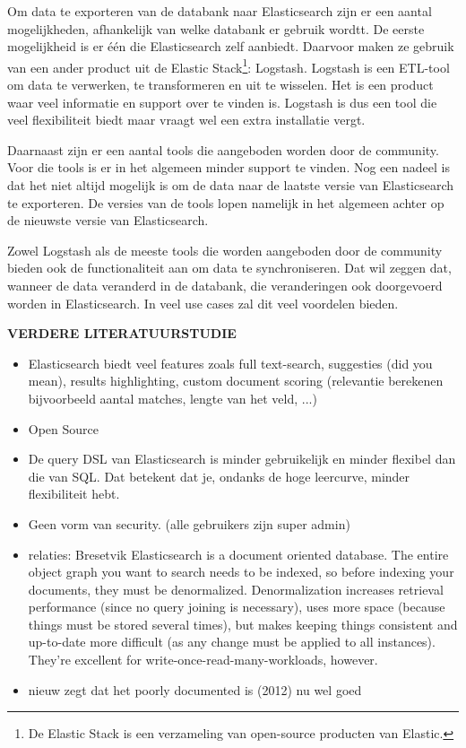 {Om data te exporteren van de databank naar Elasticsearch zijn er een aantal mogelijkheden, afhankelijk van welke databank er gebruik wordtt. De eerste mogelijkheid is er één die Elasticsearch zelf aanbiedt. Daarvoor maken ze gebruik van een ander product uit de Elastic Stack\footnote{De Elastic Stack is een verzameling van open-source producten van Elastic.}: Logstash. Logstash is een ETL-tool om data te verwerken, te transformeren en uit te wisselen. Het is een product waar veel informatie en support over te vinden is. Logstash is dus een tool die veel flexibiliteit biedt maar vraagt wel een extra installatie vergt. 

Daarnaast zijn er een aantal tools die aangeboden worden door de community. Voor die tools is er in het algemeen minder support te vinden. Nog een nadeel is dat het niet altijd mogelijk is om de data naar de laatste versie van Elasticsearch te exporteren. De versies van de tools lopen namelijk in het algemeen achter op de nieuwste versie van Elasticsearch. 

Zowel Logstash als de meeste tools die worden aangeboden door de community bieden ook de functionaliteit aan om data te synchroniseren. Dat wil zeggen dat, wanneer de data veranderd in de databank, die veranderingen ook doorgevoerd worden in Elasticsearch. In veel use cases zal dit veel voordelen bieden. 

\textbf{VERDERE LITERATUURSTUDIE}

\begin{itemize}
	\item Elasticsearch biedt veel features zoals full text-search, suggesties (did you mean), results highlighting, custom document scoring (relevantie berekenen bijvoorbeeld aantal matches, lengte van het veld, ...) 
	\item Open Source
	\item De query DSL van Elasticsearch is minder gebruikelijk en minder flexibel dan die van SQL. Dat betekent dat je, ondanks de hoge leercurve, minder flexibiliteit hebt.  
	\item Geen vorm van security. (alle gebruikers zijn super admin) 
	\item relaties: Bresetvik Elasticsearch is a document oriented database. The entire object graph you want to search needs to be indexed, so before indexing your documents, they must be denormalized. Denormalization increases retrieval performance (since no query joining is necessary), uses more space (because things must be stored several times), but makes keeping things consistent and up-to-date more difficult (as any change must be applied to all instances). They're excellent for write-once-read-many-workloads, however.
	\item nieuw zegt dat het poorly documented is (2012) nu wel goed
\end{itemize}




}
